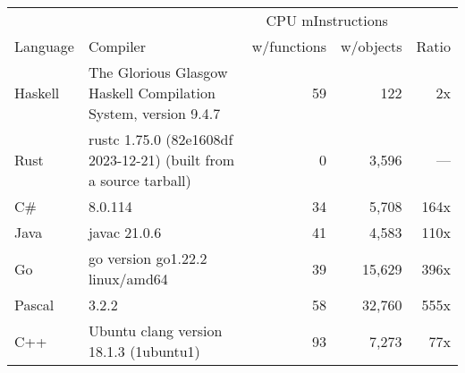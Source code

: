 \documentclass{article}
\begin{document}
      \begin{tabularx}{\linewidth}{lXrrr}
      \toprule
        & & \multicolumn{2}{c}{CPU mInstructions} & \\
        Language & Compiler & w/functions & w/objects & Ratio \\
      \midrule
    Haskell & The Glorious Glasgow Haskell Compilation System, version 9.4.7 & 59 & 122 & 2x \\
Rust & rustc 1.75.0 (82e1608df 2023-12-21) (built from a source tarball) & 0 & 3,596 & --- \\
C\# & 8.0.114 & 34 & 5,708 & 164x \\
Java & javac 21.0.6 & 41 & 4,583 & 110x \\
Go & go version go1.22.2 linux/amd64 & 39 & 15,629 & 396x \\
Pascal & 3.2.2 & 58 & 32,760 & 555x \\
C++ & Ubuntu clang version 18.1.3 (1ubuntu1) & 93 & 7,273 & 77x \\

      \bottomrule
      \end{tabularx}
      
\end{document}
